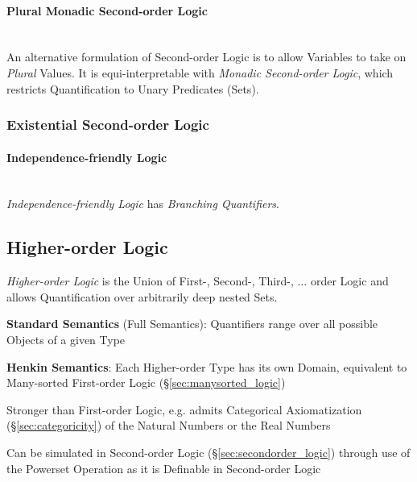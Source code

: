 \paragraph{Plural Monadic Second-order Logic}\hfill
\label{sec:plural_monadic_secondorder}\hfill \\

An alternative formulation of Second-order Logic is to allow Variables
to take on \emph{Plural} Values. It is equi-interpretable with
\emph{Monadic Second-order Logic}, which restricts Quantification to
Unary Predicates (Sets).



\subsubsection{Existential Second-order Logic}
\label{sec:existential_secondorder}

\paragraph{Independence-friendly\hfill
  Logic}\label{sec:independence_logic}\hfill \\

\emph{Independence-friendly Logic} has \emph{Branching Quantifiers}.



\subsection{Higher-order Logic}\label{sec:higherorder_logic}

\emph{Higher-order Logic} is the Union of First-, Second-, Third-,
$\ldots$ order Logic and allows Quantification over arbitrarily deep
nested Sets.

\textbf{Standard Semantics} (Full Semantics): Quantifiers range over all
possible Objects of a given Type

\textbf{Henkin Semantics}: Each Higher-order Type has its own Domain,
equivalent to Many-sorted First-order Logic
(\S\ref{sec:manysorted_logic})

Stronger than First-order Logic, e.g. admits Categorical
Axiomatization (\S\ref{sec:categoricity}) of the Natural Numbers or
the Real Numbers

Can be simulated in Second-order Logic (\S\ref{sec:secondorder_logic})
through use of the Powerset Operation as it is Definable in
Second-order Logic

